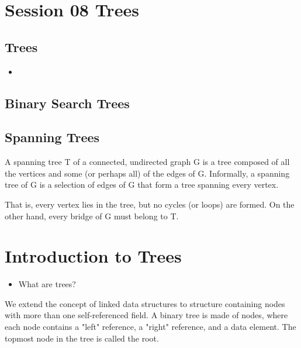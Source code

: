 \documentclass[12pt]{article}
\begin{document}
\section*{Session 08 Trees}
\subsection*{Trees}
\begin{itemize}
\item 
\end{itemize}

\subsection*{Binary Search Trees}

\subsection*{Spanning Trees}


A spanning tree T of a connected, undirected graph G is a tree composed of all the vertices and some (or perhaps all) of the edges of G. Informally, a spanning tree of G is a selection of edges of G that form a tree spanning every vertex.


 That is, every vertex lies in the tree, but no cycles (or loops) are formed. On the other hand, every bridge of G must belong to T.
 

\section{Introduction to Trees}
\begin{itemize}
\item What are trees?
\end{itemize}


We extend the concept of linked data structures to structure containing nodes with more than one self-referenced field. A binary tree is made of nodes, where each node contains a "left" reference, a "right" reference, and a data element. The topmost node in the tree is called the root.

\end{document}
